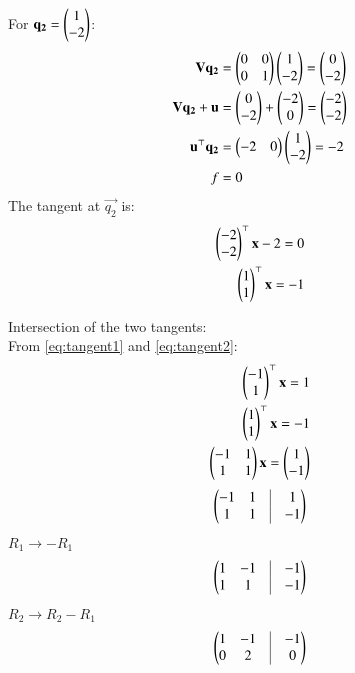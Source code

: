 \documentclass[journal]{IEEEtran}
\begin{document}
    For $\mathbf{q_2} = \begin{pmatrix}1 \\ -2\end{pmatrix}$:
    \begin{align}
    \mathbf{V}\mathbf{q_2} &= \begin{pmatrix}0 & 0 \\ 0 & 1\end{pmatrix}\begin{pmatrix}1 \\ -2\end{pmatrix} = \begin{pmatrix}0 \\ -2\end{pmatrix} \\
    \mathbf{V}\mathbf{q_2} + \mathbf{u} &= \begin{pmatrix}0 \\ -2\end{pmatrix} + \begin{pmatrix}-2 \\ 0\end{pmatrix} = \begin{pmatrix}-2 \\ -2\end{pmatrix} \\
    \mathbf{u}^{\top}\mathbf{q_2} &= \begin{pmatrix}-2 & 0\end{pmatrix}\begin{pmatrix}1 \\ -2\end{pmatrix} = -2 \\
    f &= 0
    \end{align}
    The tangent at $\vec{q_2}$ is:
    \begin{align}
    \begin{pmatrix}-2 \\ -2\end{pmatrix}^\top\mathbf{x} - 2 = 0\\
    \begin{pmatrix}1 \\ 1\end{pmatrix}^\top\mathbf{x}=-1\label{eq:tangent2}
    \end{align}
      
      
    Intersection of the two tangents:\\
   From \ref{eq:tangent1} and \ref{eq:tangent2}:
    \begin{align}
     \begin{pmatrix}-1 \\ 1\end{pmatrix}^\top\mathbf{x}=1\\
    \begin{pmatrix}1 \\ 1\end{pmatrix}^\top\mathbf{x}=-1\\
    \begin{pmatrix}-1 & 1 \\ 1 & 1\end{pmatrix}\mathbf{x}=\begin{pmatrix}1\\-1\end{pmatrix}
    \end{align}
   \begin{align}
   \myvec{
   -1 & 1 & \vrule & 1\\ 1 & 1 & \vrule & -1 
   }
   \end{align}
   $R_1\rightarrow -R_1$
   \begin{align}
   \myvec{
   1 & -1 & \vrule & -1\\ 1 & 1 & \vrule & -1 
   }\\
   \end{align}
   $R_2\rightarrow R_2-R_1$
   \begin{align}
   \myvec{
   1 & -1 & \vrule & -1\\ 0 & 2 & \vrule & 0
   }\\
   \end{align}
\end{document}
